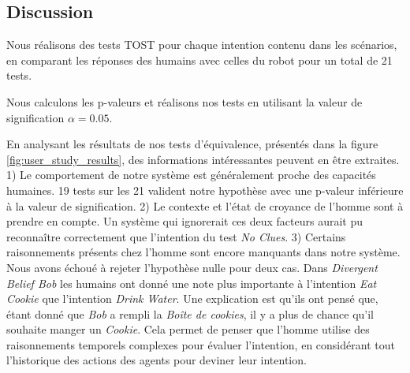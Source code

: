 \documentclass[a4paper,11pt,twoside]{StyleThese}
\begin{document}
\subsection{Discussion}
\label{discussion}
Nous réalisons des tests TOST pour chaque intention contenu dans les scénarios, en comparant les réponses des humains avec celles du robot pour un total de 21 tests.

Nous calculons les p-valeurs et réalisons nos tests en utilisant la valeur de signification $\alpha=0.05$.

En analysant les résultats de nos tests d'équivalence, présentés dans la figure \ref{fig:user_study_results}, des informations intéressantes peuvent en être extraites. 1) Le comportement de notre système est généralement proche des capacités humaines. 19 tests sur les 21 valident notre hypothèse avec une p-valeur inférieure à la valeur de signification. 2) Le contexte et l'état de croyance de l'homme sont à prendre en compte. Un système qui ignorerait ces deux facteurs aurait pu reconnaître correctement que l'intention du test \textit{No Clues}. 3) Certains raisonnements présents chez l'homme sont encore manquants dans notre système. Nous avons échoué à rejeter l'hypothèse nulle pour deux cas. Dans \textit{Divergent Belief Bob} les humains ont donné une note plus importante à l'intention \textit{Eat Cookie} que l'intention \textit{Drink Water}. Une explication est qu'ils ont pensé que, étant donné que \textit{Bob} a rempli la \textit{Boîte de cookies}, il y a plus de chance qu'il souhaite manger un \textit{Cookie}. Cela permet de penser que l'homme utilise des raisonnements temporels complexes pour évaluer l'intention, en considérant tout l'historique des actions des agents pour deviner leur intention.
\end{document}
